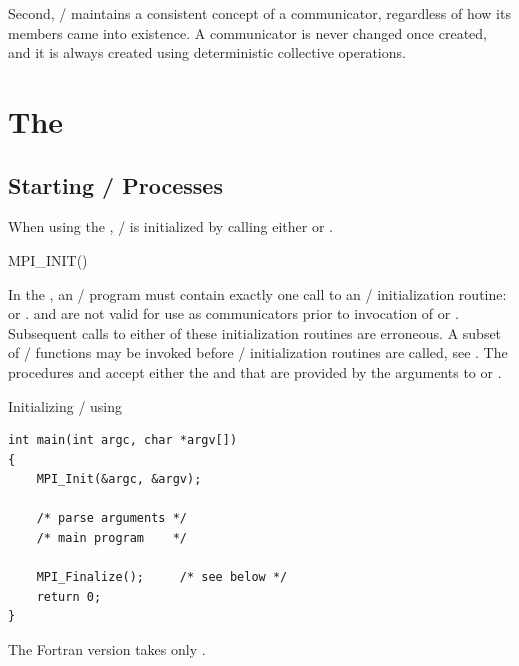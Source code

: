 Second, \mpi/ maintains a consistent concept of a communicator, regardless
of how its members came into existence.
A communicator is never changed once created, and it is always
created using deterministic collective operations.

\section{The \texorpdfstring{\wpm}{World Model}}
\label{sec:dynamic:initialization}

\subsection{Starting \texorpdfstring{\mpi/}{MPI} Processes}
\label{sec:inquiry-startup}

\label{sec:misc-init}

When using the \wpm{}, \MPI/ is initialized by calling
either  or .

\begin{funcdefna}{MPI\_INIT}{()}
\end{funcdefna}

In the \wpm{},  an \MPI/ program must contain exactly one call to an \MPI/ initialization routine:
 or .  and  are not valid for use as communicators
prior to invocation of  or .  Subsequent calls to either of these
initialization routines are erroneous. A subset of \MPI/ functions may be invoked
before \MPI/ initialization routines are called, see .
The procedures  and  accept either the  and  that are provided by the arguments to
 or .
\begin{example}
%
Initializing \MPI/ using 
\begin{lstlisting}[language={[MPI]C}]
int main(int argc, char *argv[])
{
    MPI_Init(&argc, &argv);

    /* parse arguments */
    /* main program    */

    MPI_Finalize();     /* see below */
    return 0;
}
\end{lstlisting}
\end{example}
The Fortran version takes only .

